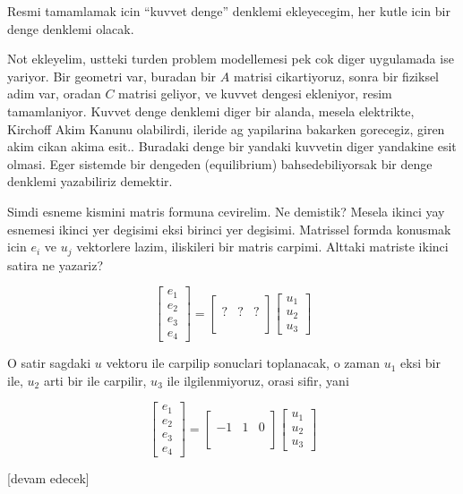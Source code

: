 \documentclass[12pt,fleqn]{article}\usepackage{../../common}
\begin{document}
Resmi tamamlamak icin ``kuvvet denge'' denklemi ekleyecegim, her kutle
icin bir denge denklemi olacak.

Not ekleyelim, ustteki turden problem modellemesi pek cok diger uygulamada ise
yariyor. Bir geometri var, buradan bir $A$ matrisi cikartiyoruz, sonra bir
fiziksel adim var, oradan $C$ matrisi geliyor, ve kuvvet dengesi ekleniyor,
resim tamamlaniyor. Kuvvet denge denklemi diger bir alanda, mesela elektrikte,
Kirchoff Akim Kanunu olabilirdi, ileride ag yapilarina bakarken gorecegiz, giren
akim cikan akima esit.. Buradaki denge bir yandaki kuvvetin diger yandakine esit
olmasi. Eger sistemde bir dengeden (equilibrium) bahsedebiliyorsak bir denge
denklemi yazabiliriz demektir.

Simdi esneme kismini matris formuna cevirelim. Ne demistik? Mesela ikinci yay
esnemesi ikinci yer degisimi eksi birinci yer degisimi. Matrissel formda
konusmak icin $e_i$ ve $u_j$  vektorlere lazim, iliskileri bir matris carpimi.
Alttaki matriste ikinci satira ne yazariz?

$$
\left[\begin{array}{c}
e_1 \\ e_2 \\ e_3 \\ e_4
\end{array}\right] =
\left[\begin{array}{cccc}
 & & \\ ? & ? & ? \\  & & \\  & & 
\end{array}\right]
\left[\begin{array}{c}
u_1 \\ u_2 \\ u_3 
\end{array}\right]
$$

O satir sagdaki $u$ vektoru ile carpilip sonuclari toplanacak, o zaman
$u_1$ eksi bir ile, $u_2$ arti bir ile carpilir, $u_3$ ile ilgilenmiyoruz,
orasi sifir, yani

$$
\left[\begin{array}{c}
e_1 \\ e_2 \\ e_3 \\ e_4
\end{array}\right] =
\left[\begin{array}{cccc}
 & & \\ -1 & 1 & 0 \\  & & \\  & & 
\end{array}\right]
\left[\begin{array}{c}
u_1 \\ u_2 \\ u_3 
\end{array}\right]
$$




















[devam edecek]
\end{document}
